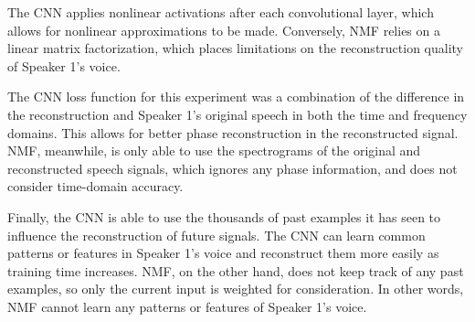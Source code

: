 \documentclass[12pt,chapterheads]{ucsd}
\begin{document}
The CNN applies nonlinear activations after each convolutional layer, which allows for nonlinear approximations to be made. Conversely, NMF relies on a linear matrix factorization, which places limitations on the reconstruction quality of Speaker 1's voice.

The CNN loss function for this experiment was a combination of the difference in the reconstruction and Speaker 1's original speech in both the time and frequency domains. This allows for better phase reconstruction in the reconstructed signal. NMF, meanwhile, is only able to use the spectrograms of the original and reconstructed speech signals, which ignores any phase information, and does not consider time-domain accuracy.

Finally, the CNN is able to use the thousands of past examples it has seen to influence the reconstruction of future signals. The CNN can learn 
common patterns or features in Speaker 1's voice and reconstruct them more easily as training time increases. NMF, on the other hand, does not keep track of any past examples, so only the current input is weighted for consideration. In other words, NMF cannot learn any patterns or features of Speaker 1's voice.


\appendix



\end{document}

